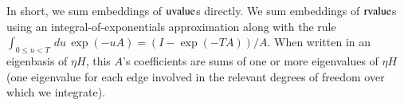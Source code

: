 \documentclass[anon,12pt]{colt2021} %
\newcommand{\uvalue}{\text{\textnormal{uvalue}}}
\newcommand{\rvalue}{\text{\textnormal{rvalue}}}
\newcommand{\plotmooh}[3]{\texttt{[image: ../\#1]}}
\newcommand{\dmoo}[2]{\texttt{[image: ../diagrams/\#2]}}
\newcommand{\sizeddia}[2]{%
    \begin{gathered}%
        \texttt{[image: ../diagrams/\#1.png]}%
    \end{gathered}%
}
\newcommand{\sdia}[1]{\protect \sizeddia{#1}{0.10}}
\begin{document}
        In short, we sum embeddings of $\uvalue$s directly.
        We sum embeddings of $\rvalue$s using an integral-of-exponentials
        approximation along with the rule 
            $\int_{0\leq u<T} \, du \, \exp(-u A) = (I - \exp(-T A))/A$. 
        When written in an eigenbasis of $\eta H$, this $A$'s coefficients are
        sums of one or more eigenvalues of $\eta H$ (one eigenvalue for each
        edge involved in the relevant degrees of freedom over which we
        integrate).  %





\end{document}
